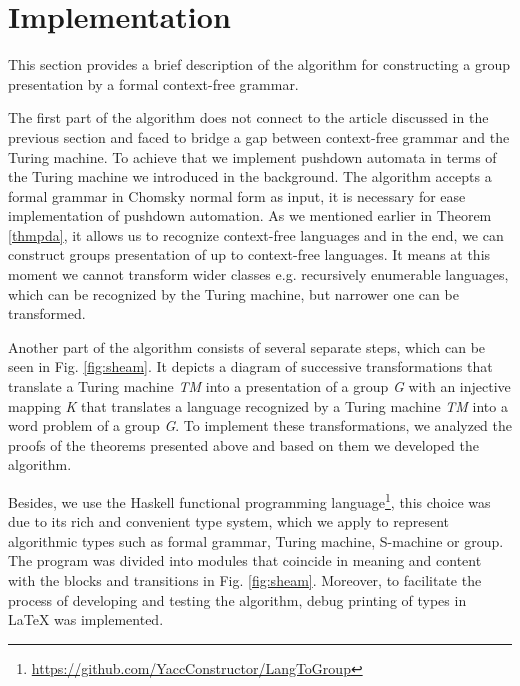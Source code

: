 \documentclass[conference]{IEEEtran}
\theoremstyle{definition}
\begin{document}
\section{Implementation}

This section provides a brief description of the algorithm for constructing 
a group presentation by a formal context-free grammar. 

The first part of the algorithm does not connect to the article discussed in the previous section and faced to bridge a gap between context-free grammar and the Turing machine. 
To achieve that we implement pushdown automata in terms of the Turing machine we introduced
in the background. The algorithm accepts a formal grammar in Chomsky normal form as input, 
it is necessary for ease implementation of pushdown automation.
As we mentioned earlier in Theorem \ref{thmpda}, it allows 
us to recognize context-free languages and in the end, 
we can construct groups presentation of 
up to context-free languages. It means at this moment we cannot transform wider 
classes e.g. recursively enumerable languages, which can be recognized 
by the Turing machine, but narrower one can be transformed. 

Another part of the algorithm consists of several separate steps, 
which can be seen in Fig. \ref{fig:sheam}. 
It depicts a diagram of successive transformations that translate 
a Turing machine \textit{TM} into a presentation of a group \textit{G} 
with an injective mapping \textit{K} that translates a language recognized by 
a Turing machine \textit{TM} into a word problem of a group \textit{G}. 
To implement these transformations, we analyzed the proofs 
of the theorems presented above and based on them we developed the algorithm. 

Besides, we use the Haskell functional programming 
language\footnote{\url{https://github.com/YaccConstructor/LangToGroup}}, 
this choice was due to its rich and convenient type system, 
which we apply to represent algorithmic types such as formal grammar, 
Turing machine, S-machine or group. The program was divided into modules 
that coincide in meaning and content with the blocks and transitions 
in Fig. \ref{fig:sheam}. Moreover, to facilitate the process of developing 
and testing the algorithm, debug printing of types in LaTeX was implemented.
\end{document}
